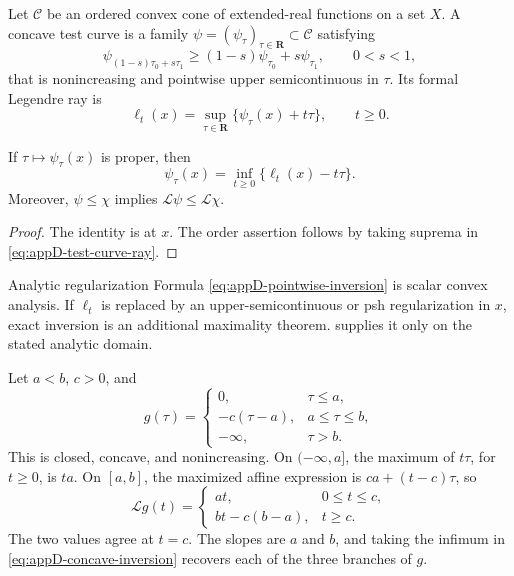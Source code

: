 \begin{definition}
\label{def:appD-test-curve}
Let \(\mathcal C\) be an ordered convex cone of extended-real functions on a
set \(X\).
A concave test curve is a family
\(\psi=(\psi_\tau)_{\tau\in\mathbf R}\subset\mathcal C\) satisfying
\[
 \psi_{(1-s)\tau_0+s\tau_1}
 \geq(1-s)\psi_{\tau_0}+s\psi_{\tau_1},
 \qquad 0<s<1,
\tag{D.11}\label{eq:appD-test-curve-concavity}
\]
that is nonincreasing and pointwise upper semicontinuous in \(\tau\).
Its formal Legendre ray is
\[
 \ell_t(x)=
 \sup_{\tau\in\mathbf R}\{\psi_\tau(x)+t\tau\},
 \qquad t\geq0.
\tag{D.12}\label{eq:appD-test-curve-ray}
\]
\end{definition}

\begin{proposition}\label{prop:appD-test-curve-order}
If \(\tau\mapsto\psi_\tau(x)\) is proper, then
\[
 \psi_\tau(x)=\inf_{t\geq0}\{\ell_t(x)-t\tau\}.
\tag{D.13}\label{eq:appD-pointwise-inversion}
\]
Moreover, \(\psi\leq\chi\) implies
\(\mathcal L\psi\leq\mathcal L\chi\).
\end{proposition}

\begin{proof}
The identity is  at \(x\).
The order assertion follows by taking suprema in
\eqref{eq:appD-test-curve-ray}.
\end{proof}

\noindent\begin{minipage}{\linewidth}
\begin{warning}{Analytic regularization}
\label{warn:appD-analytic-regularization}
Formula \eqref{eq:appD-pointwise-inversion} is scalar convex analysis.
If \(\ell_t\) is replaced by an upper-semicontinuous or psh regularization
in \(x\), exact inversion is an additional maximality theorem.
 supplies it only on the stated analytic
domain.
\end{warning}
\end{minipage}\par

\begin{example}
\label{ex:appD-single-break}
Let \(a<b\), \(c>0\), and
\[
 g(\tau)=
 \begin{cases}
 0,&\tau\leq a,\\
 -c(\tau-a),&a\leq\tau\leq b,\\
 -\infty,&\tau>b.
 \end{cases}
\]
This is closed, concave, and nonincreasing.
On \(( -\infty,a]\), the maximum of \(t\tau\), for \(t\geq0\),
is \(ta\).  On \([a,b]\), the maximized affine expression is
\(ca+(t-c)\tau\), so
\[
 \mathcal Lg(t)=
 \begin{cases}
 at,&0\leq t\leq c,\\
 bt-c(b-a),&t\geq c.
 \end{cases}
\]
The two values agree at \(t=c\).  The slopes are \(a\) and \(b\),
and taking the infimum in \eqref{eq:appD-concave-inversion} recovers
each of the three branches of \(g\).
\end{example}

